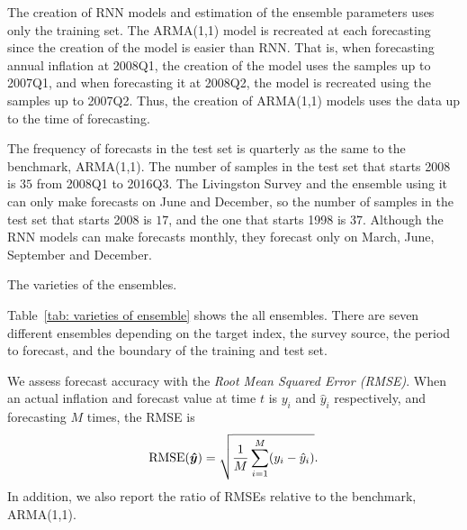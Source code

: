 \documentclass[../main.tex]{subfiles}
\begin{document}
The creation of RNN models and estimation of the ensemble parameters uses only the training set.
The ARMA(1,1) model is recreated at each forecasting since the creation of the model is easier than RNN\@.
That is, when forecasting annual inflation at 2008Q1, the creation of the model uses the samples up to 2007Q1, and when forecasting it at 2008Q2, the model is recreated using the samples up to 2007Q2.
Thus, the creation of ARMA(1,1) models uses the data up to the time of forecasting.

The frequency of forecasts in the test set is quarterly as the same to the benchmark, ARMA(1,1).
The number of samples in the test set that starts 2008 is $35$ from 2008Q1 to 2016Q3.
The Livingston Survey and the ensemble using it can only make forecasts on June and December, so the number of samples in the test set that starts 2008 is $17$, and the one that starts 1998 is $37$.
Although the RNN models can make forecasts monthly, they forecast only on March, June, September and December.

\begin{table}
  \caption{
    The varieties of the ensembles.
  }\label{tab: varieties of ensemble}
  \begin{center}
    \footnotesize
    
  \end{center}
\end{table}

Table~\ref{tab: varieties of ensemble} shows the all ensembles.
There are seven different ensembles depending on the target index, the survey source, the period to forecast, and the boundary of the training and test set.

We assess forecast accuracy with the \emph{Root Mean Squared Error (RMSE)}.
When an actual inflation and forecast value at time $t$ is $y_i$ and $\hat{y}_i$ respectively, and forecasting $M$ times, the RMSE is
\begin{equation}
  \operatorname{RMSE}(\bm{\hat{y}}) = \sqrt{\frac{1}{M}\sum_{i=1}^{M}(y_i - \hat{y}_i)}.
\end{equation}
In addition, we also report the ratio of RMSEs relative to the benchmark, ARMA(1,1).
\end{document}
